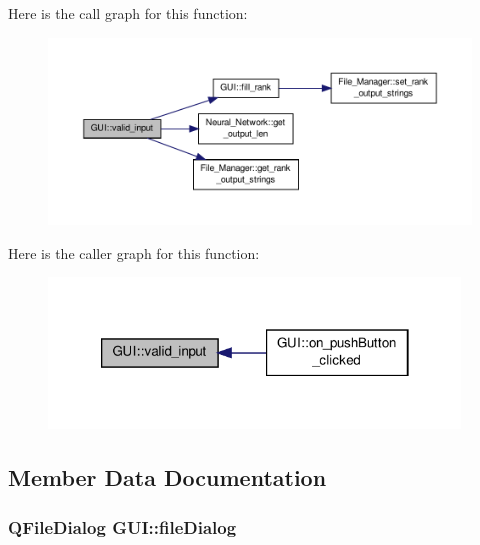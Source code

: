 Here is the call graph for this function\-:
\nopagebreak
\begin{figure}[H]
\begin{center}
\leavevmode
\includegraphics[width=350pt]{d7/d46/a00002_a5ec9d8a051303b218c4542f96a87b56f_cgraph}
\end{center}
\end{figure}




Here is the caller graph for this function\-:\nopagebreak
\begin{figure}[H]
\begin{center}
\leavevmode
\includegraphics[width=310pt]{d7/d46/a00002_a5ec9d8a051303b218c4542f96a87b56f_icgraph}
\end{center}
\end{figure}




\subsection{Member Data Documentation}
\hypertarget{a00002_a9ed0a8b583419e88bb94697a9b258c72}{
\subsubsection[{file\-Dialog}]{\setlength{\rightskip}{0pt plus 5cm}Q\-File\-Dialog G\-U\-I\-::file\-Dialog\hspace{0.3cm}{\ttfamily [private]}}}\label{d7/d46/a00002_a9ed0a8b583419e88bb94697a9b258c72}


